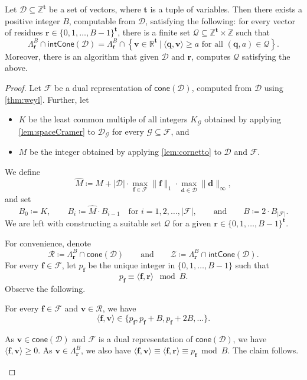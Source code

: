\documentclass{theoretics}
\renewcommand{\geq}{\geqslant}
\newcommand{\Dd}{\mathcal{D}}
\newcommand{\Z}{\mathbb{Z}}
\newcommand{\R}{\mathbb{R}}
\newcommand{\tup}[1]{{\mathbf{#1}}}
\newcommand{\tv}{\tup t}
\newcommand{\ff}{\tup f}
\newcommand{\rr}{\tup r}
\newcommand{\dd}{\tup d}
\newcommand{\qq}{\tup q}
\newcommand{\myvv}{\tup v} %
\newcommand{\Qq}{\mathcal{Q}}
\newcommand{\Ff}{\mathcal{F}}
\newcommand{\Gg}{\mathcal{G}}
\newcommand{\Rr}{\mathcal{R}}
\newcommand{\Zz}{\mathcal{Z}}
\newcommand{\sca}[2]{\langle #1,#2\rangle}
\newcommand{\realcone}{\mathsf{cone}}
\newcommand{\intcone}{\mathsf{intCone}}
\begin{document}
\begin{theorem}\label{thm:polyhedron}
 Let $\Dd\subseteq \Z^\tv$ be a set of vectors, where $\tv$ is a tuple of variables. Then there exists a positive integer $B$, computable from $\Dd$, satisfying the following: for every vector of residues $\rr\in \{0,1,\ldots,B-1\}^\tv$, there is a finite set $\Qq\subseteq \Z^\tv\times \Z$ such that
 $$\Lambda^B_\rr\cap \intcone(\Dd) = \Lambda^B_\rr\cap \left\{\myvv\in \R^\tv~|~\sca{\qq}{\myvv}\geq a\textrm{ for all }(\qq,a)\in \Qq\right\}.$$
 Moreover, there is an algorithm that given $\Dd$ and $\rr$, computes $\Qq$ satisfying the above.
\end{theorem}
\begin{proof}
 Let $\Ff$ be a dual representation of $\realcone(\Dd)$, computed from $\Dd$ using \cref{thm:weyl}. Further, let
 \begin{itemize}[nosep]
  \item $K$ be the least common multiple of all integers $K_\Gg$ obtained by applying \cref{lem:spaceCramer} to $\Dd_\Gg$ for every $\Gg\subseteq \Ff$, and
  \item $M$ be the integer obtained by applying \cref{lem:cornetto} to $\Dd$ and $\Ff$.
 \end{itemize}
 We define
 $$\widehat{M}\coloneqq M+|\Dd|\cdot \max_{\ff\in \Ff} \|\ff\|_1\cdot \max_{\dd\in \Dd} \|\dd\|_\infty,$$
and set
 $$B_0\coloneqq K,\qquad B_i\coloneqq \widehat{M}\cdot B_{i-1}\quad\textrm{for }i=1,2,\ldots,|\Ff|,\qquad \textrm{and}\qquad B\coloneqq 2\cdot B_{|\Ff|}.$$
We are left with constructing a suitable set $\Qq$ for a given $\rr\in \{0,1,\ldots,B-1\}^{\tv}$.

For convenience, denote
$$\Rr\coloneqq \Lambda_\rr^B\cap \realcone(\Dd)\qquad\textrm{and}\qquad \Zz\coloneqq \Lambda_\rr^B\cap \intcone(\Dd).$$
For every $\ff\in \Ff$, let $p_\ff$ be the unique integer in $\{0,1,\ldots,B-1\}$ such that
$$p_\ff\equiv \sca{\ff}{\rr}\mod B.$$
Observe the following.

\begin{techclaim}\label{cl:discreteSteps}
 For every $\ff\in \Ff$ and $\myvv\in \Rr$, we have
 $$\sca{\ff}{\myvv}\in \{p_\ff,p_\ff+B,p_\ff+2B,\ldots\}.$$
\end{techclaim}
\begin{subproof}
 As $\myvv\in \realcone(\Dd)$ and $\Ff$ is a dual representation of $\realcone(\Dd)$, we have $\sca{\ff}{\myvv}\geq 0$. As $\myvv\in \Lambda_\rr^B$, we also have $\sca{\ff}{\myvv}\equiv \sca{\ff}{\rr}\equiv p_\ff \bmod B$. The claim follows.
\end{subproof}


\end{proof}
\end{document}
